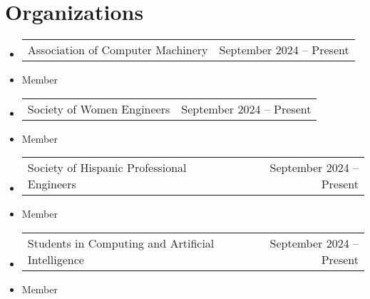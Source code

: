 \documentclass[letterpaper,11pt]{article}
\makeatletter
\newcommand{\resumeItem}[1]{
  \item\small{
    {#1 \vspace{-2pt}}
  }
}
\newcommand{\resumeProjectHeading}[2]{
    \item
    \begin{tabular*}{0.97\textwidth}{l@{\extracolsep{\fill}}r}
      \small#1 & #2 \\
    \end{tabular*}\vspace{-7pt}
}
\newcommand{\resumeSubHeadingListStart}{\begin{itemize}[leftmargin=0.15in, label={}]}
\newcommand{\resumeSubHeadingListEnd}{\end{itemize}}
\makeatother
\begin{document}
\section{Organizations}

\resumeSubHeadingListStart
\resumeProjectHeading
    {{Association of Computer Machinery} \emph} {\small September 2024 -- Present}
    \resumeItem \small{Member}
\resumeProjectHeading
    {{Society of Women Engineers} \emph}{September 2024 -- Present}
    \resumeItem \small{Member}
\resumeProjectHeading
    {{Society of Hispanic Professional Engineers} \emph}{September 2024 -- Present}  
    \resumeItem \small{Member}
\resumeProjectHeading
    {{Students in Computing and Artificial Intelligence} \emph}{September 2024 -- Present}
    \resumeItem \small{Member}
\resumeSubHeadingListEnd

\end{document}
